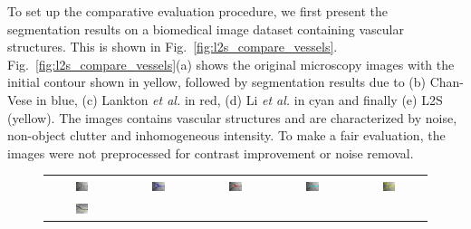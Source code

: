 To set up the comparative evaluation procedure, we first present the segmentation results on a biomedical image dataset containing vascular structures. This is shown in Fig.~\ref{fig:l2s_compare_vessels}. Fig.~\ref{fig:l2s_compare_vessels}(a) shows the original microscopy images with the initial contour shown in yellow, followed by segmentation results due to (b) Chan-Vese in blue, (c) Lankton \textit{et al.} in red, (d) Li \textit{et al.} in cyan and finally (e) L2S (yellow). The images contains vascular structures and are characterized by  noise, non-object clutter and inhomogeneous intensity. To make a fair evaluation, the images were not preprocessed for contrast improvement or noise removal. 
\begin{figure}[t]
\centering
\renewcommand{\tabcolsep}{0.05cm}
\begin{tabular}{@{}ccccc@{}}
\includegraphics[width=0.19\textwidth]{images/L2S_compare_region/19_orig}	&
\includegraphics[width=0.19\textwidth]{images/L2S_compare_region/19_CV}	&
\includegraphics[width=0.19\textwidth]{images/L2S_compare_region/19_Lankton}		&
\includegraphics[width=0.19\textwidth]{images/L2S_compare_region/19_Li}	&
\includegraphics[width=0.19\textwidth]{images/L2S_compare_region/19_ours}	
\\
\includegraphics[width=0.19\textwidth]{images/L2S_compare_region/22_trng_orig}	&

\end{tabular}
\end{figure}

